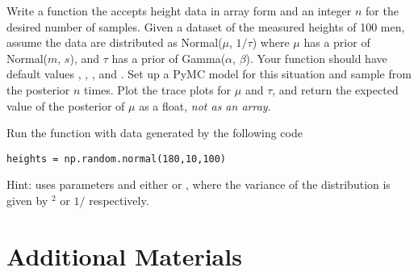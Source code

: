 \begin{problem}
Write a function the accepts height data in array form and an integer $n$ for the desired number of samples.
Given a dataset of the measured heights of 100 men, assume the data are distributed as Normal($\mu$, $1/\tau$) where $\mu$ has a prior of Normal($m$, $s$), and $\tau$ has a prior of Gamma($\alpha$, $\beta$).
Your function should have default values , , , and .
Set up a PyMC model for this situation and sample from the posterior $n$ times.
Plot the trace plots for $\mu$ and $\tau$, and return the expected value of the posterior of $\mu$ as a float, \emph{not as an array}.

Run the function with data generated by the following code 
\begin{lstlisting}
heights = np.random.normal(180,10,100)
\end{lstlisting}
\noindent Hint:  uses parameters  and either  or , where the variance of the distribution is given by $^2$ or $1/$ respectively.
\end{problem}


\newpage
\section*{Additional Materials}

